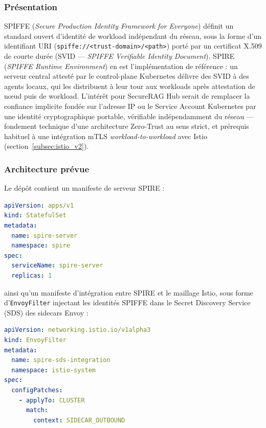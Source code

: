 \subsubsection{Présentation}
SPIFFE (\textit{Secure Production Identity Framework for Everyone}) définit un standard ouvert d'identité de workload indépendant du réseau, sous la forme d'un identifiant URI (\texttt{spiffe://<trust-domain>/<path>}) porté par un certificat X.509 de courte durée (SVID — \textit{SPIFFE Verifiable Identity Document}). SPIRE (\textit{SPIFFE Runtime Environment}) en est l'implémentation de référence : un serveur central attesté par le control-plane Kubernetes délivre des SVID à des agents locaux, qui les distribuent à leur tour aux workloads après attestation de nœud puis de workload. L'intérêt pour SecureRAG Hub serait de remplacer la confiance implicite fondée sur l'adresse IP ou le Service Account Kubernetes par une identité cryptographique portable, vérifiable indépendamment du réseau — fondement technique d'une architecture Zero-Trust au sens strict, et prérequis habituel à une intégration mTLS \textit{workload-to-workload} avec Istio (section~\ref{subsec:istio_v2}).

\subsubsection{Architecture prévue}
Le dépôt contient un manifeste de serveur SPIRE :

\begin{lstlisting}[language=yaml, caption={Extrait réel du StatefulSet SPIRE Server (\texttt{infra/k8s/spire/spire-server.yaml})}, label={lst:spire_server_reel}]
apiVersion: apps/v1
kind: StatefulSet
metadata:
  name: spire-server
  namespace: spire
spec:
  serviceName: spire-server
  replicas: 1
\end{lstlisting}

ainsi qu'un manifeste d'intégration entre SPIRE et le maillage Istio, sous forme d'\texttt{EnvoyFilter} injectant les identités SPIFFE dans le Secret Discovery Service (SDS) des sidecars Envoy :

\begin{lstlisting}[language=yaml, caption={Extrait réel de l'intégration SPIRE/Istio SDS (\texttt{infra/k8s/istio/spire-integration.yaml})}, label={lst:spire_istio_reel}]
apiVersion: networking.istio.io/v1alpha3
kind: EnvoyFilter
metadata:
  name: spire-sds-integration
  namespace: istio-system
spec:
  configPatches:
    - applyTo: CLUSTER
      match:
        context: SIDECAR_OUTBOUND
\end{lstlisting}

